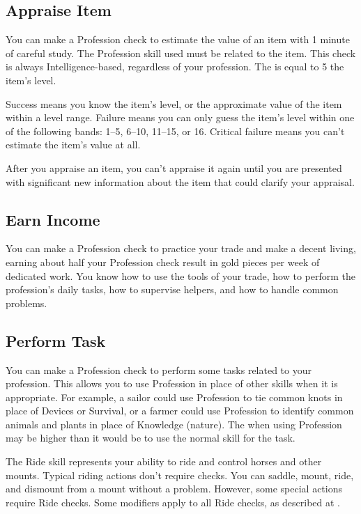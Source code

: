     \subsection{Appraise Item}
        You can make a Profession check to estimate the value of an item with 1 minute of careful study.
        The Profession skill used must be related to the item.
        This check is always Intelligence-based, regardless of your profession.
        The  is equal to 5 \add the item's level.

        Success means you know the item's level, or the approximate value of the item within a level range.
        Failure means you can only guess the item's level within one of the following bands: 1--5, 6--10, 11--15, or 16\plus.
        Critical failure means you can't estimate the item's value at all.

        After you appraise an item, you can't appraise it again until you are presented with significant new information about the item that could clarify your appraisal.

    \subsection{Earn Income}
        You can make a Profession check to practice your trade and make a decent living, earning about half your Profession check result in gold pieces per week of dedicated work. You know how to use the tools of your trade, how to perform the profession's daily tasks, how to supervise helpers, and how to handle common problems.

    \subsection{Perform Task}
        You can make a Profession check to perform some tasks related to your profession. This allows you to use Profession in place of other skills when it is appropriate. For example, a sailor could use Profession to tie common knots in place of Devices or Survival, or a farmer could use Profession to identify common animals and plants in place of Knowledge (nature). The  when using Profession may be higher than it would be to use the normal skill for the task.

\newpage
{}
    The Ride skill represents your ability to ride and control horses and other mounts.
    Typical riding actions don't require checks. You can saddle, mount, ride, and dismount from a mount without a problem. However, some special actions require Ride checks. Some modifiers apply to all Ride checks, as described at .

